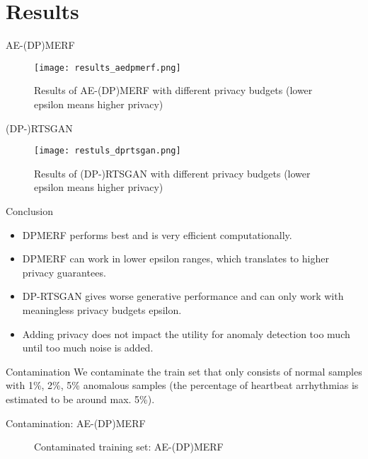 \section{Results}

\begin{frame}{AE-(DP)MERF}
    \begin{figure}
        \centering
        \texttt{[image: results\_aedpmerf.png]}
        \caption{Results of AE-(DP)MERF with different privacy budgets (lower epsilon means higher privacy)}
        \label{fig:enter-label}
    \end{figure}
\end{frame}

\begin{frame}{(DP-)RTSGAN}
    \begin{figure}
        \centering
        \texttt{[image: restuls\_dprtsgan.png]}
        \caption{Results of (DP-)RTSGAN with different privacy budgets (lower epsilon means higher privacy)}
        \label{fig:enter-label}
    \end{figure}
\end{frame}

\begin{frame}{Conclusion}
    \begin{itemize}
        \item DPMERF performs best and is very efficient computationally.
        \item DPMERF can work in lower epsilon ranges, which translates to higher privacy guarantees.
        \item DP-RTSGAN gives worse generative performance and can only work with meaningless privacy budgets epsilon.
        \item Adding privacy does not impact the utility for anomaly detection too much until too much noise is added.
    \end{itemize}
\end{frame}

\begin{frame}{Contamination}
    We contaminate the train set that only consists of normal samples with 1\%, 2\%, 5\% anomalous samples (the percentage of heartbeat arrhythmias is estimated to be around max. 5\%).
\end{frame}

\begin{frame}{Contamination: AE-(DP)MERF}
    \begin{figure}

        \centering

        \caption{Contaminated training set: AE-(DP)MERF}

    \end{figure}
\end{frame}

